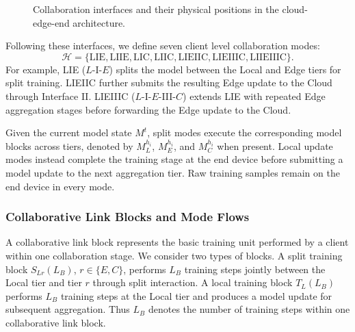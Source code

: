 \documentclass[5p,times]{elsarticle}
\theoremstyle{plain}
\theoremstyle{definition}
\theoremstyle{remark}
\begin{document}
\begin{figure}[t]

    \vspace{-0.15cm}
    \caption{Collaboration interfaces and their physical positions in the
    cloud-edge-end architecture.}
    \label{fig:collaboration_graph}
\end{figure}
Following these interfaces, we define seven client level collaboration modes:
\begin{equation}
\mathcal H=
\{\mathrm{LIE},\mathrm{LIIE},\mathrm{LIC},\mathrm{LIIC},
\mathrm{LIEIIC},\mathrm{LIEIIIC},\mathrm{LIIEIIIC}\}.
\label{eq:seven_modes}
\end{equation}
For example, LIE (\(L\)-I-\(E\)) splits the model between the Local and
Edge tiers for split training. LIEIIC further submits the resulting Edge update to the Cloud through Interface II.
LIEIIIC (\(L\)-I-\(E\)-III-\(C\)) extends LIE with repeated Edge
aggregation stages before forwarding the Edge update to the Cloud.

Given the current model state \(M^t\), split modes execute the corresponding
model blocks across tiers, denoted by \(M_L^{h_i}\), \(M_E^{h_i}\), and
\(M_C^{h_i}\) when present. Local update modes instead complete the training
stage at the end device before submitting a model update to the next
aggregation tier. Raw training samples remain on the end device in every mode.

\subsubsection{Collaborative Link Blocks and Mode Flows}
A collaborative link block represents the basic training unit performed by a
client within one collaboration stage. We consider two types of blocks.
A split training block \(S_{Lr}(L_B)\), \(r\in\{E,C\}\), performs \(L_B\) training steps jointly between the Local tier and tier \(r\) through split interaction. A local training block \(T_L(L_B)\) performs \(L_B\) training steps at the Local tier and produces a model update for subsequent aggregation. Thus \(L_B\) denotes the number of training steps within one collaborative link block.
\end{document}
